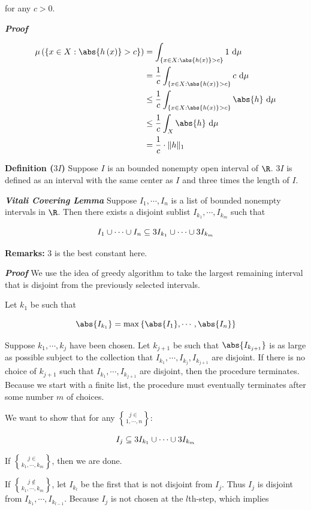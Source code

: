 \documentclass[
]{article}
\begin{document}
for any \(c>0\).

\emph{\textbf{Proof}}

\[\ba
\lm{\brace{x\in X:\abs{h\pr{x}}>c}} & = \int_{\brace{x\in X:\abs{h\pr{x}}>c}}1\dm \\
& = \frac1c\int_{\brace{x\in X:\abs{h\pr{x}}>c}}c\dm \\
& \le \frac1c\int_{\brace{x\in X:\abs{h\pr{x}}>c}}\abs{h} \dm \\
& \le \frac1c\int_{X}\abs{h} \dm\\
& = \frac1c\cdot \norm{h}
\ea\]

\textbf{Definition (\(3I\))} Suppose \(I\) is an bounded nonempty open
interval of \(\R\). \(3I\) is defined as an interval with the same
center as \(I\) and three times the length of \(I\).

\emph{\textbf{Vitali Covering Lemma}} Suppose \(I_1,\cdots,I_n\) is a
list of bounded nonempty intervals in \(\R\). Then there exists a
disjoint sublist \(I_{k_1}, \cdots, I_{k_m}\) such that

\[I_1\cup \cdots \cup I_n\subseteq 3I_{k_1}\cup \cdots \cup 3I_{k_{m}}\]

\textbf{Remarks:} \(3\) is the best constant here.

\emph{\textbf{Proof}} We use the idea of greedy algorithm to take the
largest remaining interval that is disjoint from the previously selected
intervals.

Let \(k_1\) be such that

\[\abs{I_{k_1}} = \max\brace{\abs{I_1},\cdots,\abs{I_n}}\]

Suppose \(k_1,\cdots,k_j\) have been chosen. Let \(k_{j+1}\) be such
that \(\abs{I_{k_{j+1}}}\) is as large as possible subject to the
collection that \(I_{k_1},\cdots,I_{k_j},I_{k_{j+1}}\) are disjoint. If
there is no choice of \(k_{j+1}\) such that
\(I_{k_1},\cdots,I_{{k_{j+1}}}\) are disjoint, then the procedure
terminates. Because we start with a finite list, the procedure must
eventually terminates after some number \(m\) of choices.

We want to show that for any \(j\in \brace{1,\cdots,n}\):

\[I_j\subseteq 3I_{k_1}\cup\cdots\cup 3I_{k_m}\]

If \(j\in\brace{k_1,\cdots,k_m}\), then we are done.

If \(j\notin \brace{k_1,\cdots,k_m}\), let \(I_{k_l}\) be the first that
is not disjoint from \(I_j\). Thus \(I_j\) is disjoint from
\(I_{k_1},\cdots,I_{k_{l-1}}\). Because \(I_j\) is not chosen at the
\(l\)th-step, which implies
\end{document}
